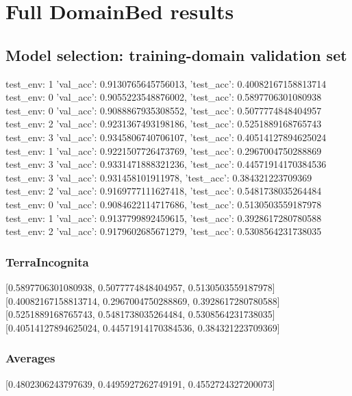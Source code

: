 \documentclass{article}
\begin{document}
\section{Full DomainBed results}

\subsection{Model selection: training-domain validation set}
test_env: 1
{'val_acc': 0.9130765645756013, 'test_acc': 0.40082167158813714}
test_env: 0
{'val_acc': 0.9055223548876002, 'test_acc': 0.5897706301080938}
test_env: 0
{'val_acc': 0.9088867935308552, 'test_acc': 0.5077774848404957}
test_env: 2
{'val_acc': 0.9231367493198186, 'test_acc': 0.5251889168765743}
test_env: 3
{'val_acc': 0.9345806740706107, 'test_acc': 0.40514127894625024}
test_env: 1
{'val_acc': 0.9221507726473769, 'test_acc': 0.2967004750288869}
test_env: 3
{'val_acc': 0.9331471888321236, 'test_acc': 0.44571914170384536}
test_env: 3
{'val_acc': 0.931458101911978, 'test_acc': 0.384321223709369}
test_env: 2
{'val_acc': 0.9169777111627418, 'test_acc': 0.5481738035264484}
test_env: 0
{'val_acc': 0.9084622114717686, 'test_acc': 0.5130503559187978}
test_env: 1
{'val_acc': 0.9137799892459615, 'test_acc': 0.3928617280780588}
test_env: 2
{'val_acc': 0.9179602685671279, 'test_acc': 0.5308564231738035}

\subsubsection{TerraIncognita}
[0.5897706301080938, 0.5077774848404957, 0.5130503559187978]
[0.40082167158813714, 0.2967004750288869, 0.3928617280780588]
[0.5251889168765743, 0.5481738035264484, 0.5308564231738035]
[0.40514127894625024, 0.44571914170384536, 0.384321223709369]

\begin{center}
\end{center}

\subsubsection{Averages}
[0.4802306243797639, 0.4495927262749191, 0.4552724327200073]

\begin{center}
\end{center}
\end{document}

